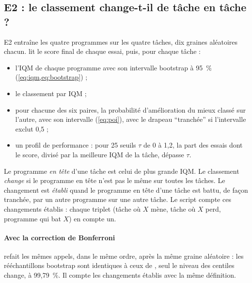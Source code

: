 \subsection{E2 : le classement change-t-il de tâche en tâche ?}\label{sec:plan-e2}
E2 entraîne les quatre programmes sur les quatre tâches, dix graines aléatoires chacun.
 lit le score final de chaque essai, puis, pour chaque tâche :
\begin{itemize}
  \item l'IQM de chaque programme avec son intervalle bootstrap à 95~\% (\cref{eq:iqm,eq:bootstrap}) ;
  \item le classement par IQM ;
  \item pour chacune des six paires, la probabilité d'amélioration du mieux classé sur l'autre, avec son
    intervalle (\cref{eq:poi}), avec le drapeau \enquote{tranchée} si l'intervalle exclut 0,5 ;
  \item un profil de performance : pour 25 seuils $\tau$ de 0 à 1,2, la part des essais dont le score, divisé
    par la meilleure IQM de la tâche, dépasse $\tau$.
\end{itemize}
Le programme \emph{en tête} d'une tâche est celui de plus grande IQM. Le classement \emph{change} si le
programme en tête n'est pas le même sur toutes les tâches. Le changement est \emph{établi} quand le programme
en tête d'une tâche est battu, de façon tranchée, par un autre programme sur une autre tâche. Le script compte
ces changements établis : chaque triplet (tâche où $X$ mène, tâche où $X$ perd, programme qui bat $X$) en
compte un.

\paragraph{Avec la correction de Bonferroni}
 refait les mêmes appels, dans le même ordre, après la même graine aléatoire : les
rééchantillons bootstrap sont identiques à ceux de , seul le niveau des centiles change, à
99,79~\%. Il compte les changements établis avec la même définition.


